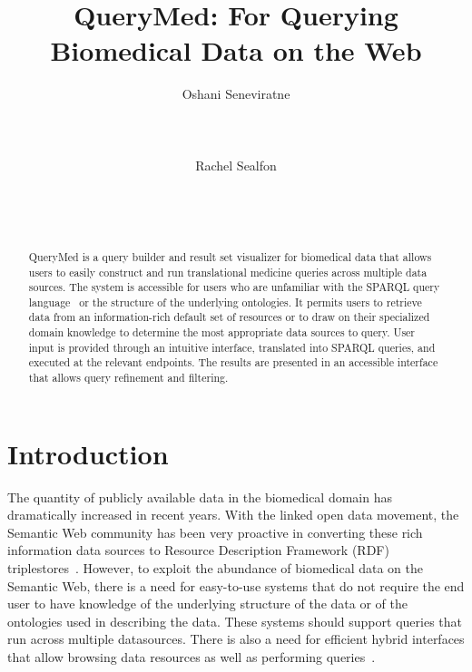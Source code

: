 \documentclass{acm_proc_article-sp}
\begin{document}
\title{QueryMed: For Querying Biomedical Data on the Web}


\author{
\alignauthor Oshani Seneviratne\\
       \\
       \\
       \\
\alignauthor Rachel Sealfon\\
       \\
       \\
       \\
}


\maketitle
\begin{abstract}

QueryMed is a query builder and result set visualizer for biomedical data that allows users to easily construct and run translational medicine queries across multiple data sources. The system is accessible for users who are unfamiliar with the SPARQL query language~\cite{SPARQL}
or the structure of the underlying ontologies. It permits users to retrieve data from an information-rich default set of resources or to draw on their specialized domain knowledge to determine the most appropriate data sources to query.  User input is provided through an intuitive interface, translated into SPARQL queries, and executed at the relevant endpoints. The results are presented in an accessible interface that allows query refinement and filtering.  

\end{abstract}


\section{Introduction}

The quantity of publicly available data in the biomedical domain has dramatically increased in recent years. With the linked open data movement, the Semantic Web community has been very proactive in converting these rich information data sources to Resource Description Framework (RDF) triplestores~\cite{LinkingData, Yip}.  However, to exploit the abundance of biomedical data on the Semantic Web, there is a need for easy-to-use systems that do not require the end user to have knowledge of the underlying  structure of the data or of the ontologies used in describing the data. These systems should support queries that run across multiple datasources.  There is also a  need for efficient hybrid interfaces that allow browsing data resources as well as performing queries~\cite{Jentzsch}.  
\end{document}
